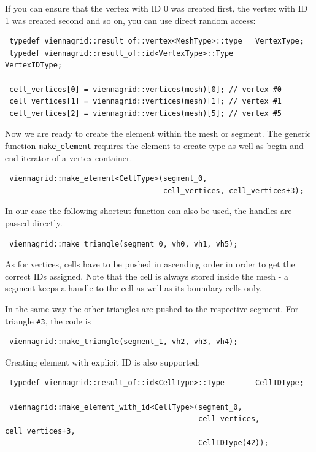 If you can ensure that the vertex with ID 0 was created first, the vertex with ID 1 was created second and so on, you can use direct random access:
\begin{lstlisting}
 typedef viennagrid::result_of::vertex<MeshType>::type   VertexType;
 typedef viennagrid::result_of::id<VertexType>::Type       VertexIDType;

 cell_vertices[0] = viennagrid::vertices(mesh)[0]; // vertex #0
 cell_vertices[1] = viennagrid::vertices(mesh)[1]; // vertex #1
 cell_vertices[2] = viennagrid::vertices(mesh)[5]; // vertex #5
\end{lstlisting}

Now we are ready to create the element within the mesh or segment. The generic function \lstinline|make_element| requires the element-to-create type as well as begin and end iterator of a vertex container.

\begin{lstlisting}
 viennagrid::make_element<CellType>(segment_0,
                                    cell_vertices, cell_vertices+3);
\end{lstlisting}

In our case the following shortcut function can also be used, the handles are passed directly.
\begin{lstlisting}
 viennagrid::make_triangle(segment_0, vh0, vh1, vh5);
\end{lstlisting}

As for vertices, cells have to be pushed in ascending order in order to get the correct IDs assigned. Note that the cell is always stored inside the mesh - a segment keeps a handle to the cell as well as its boundary cells only.

In the same way the other triangles are pushed to the respective segment. For triangle \lstinline|#3|, the code is
\begin{lstlisting}
 viennagrid::make_triangle(segment_1, vh2, vh3, vh4);
\end{lstlisting}

Creating element with explicit ID is also supported:

\begin{lstlisting}
 typedef viennagrid::result_of::id<CellType>::Type       CellIDType;

 viennagrid::make_element_with_id<CellType>(segment_0,
                                            cell_vertices, cell_vertices+3,
                                            CellIDType(42));
\end{lstlisting}
